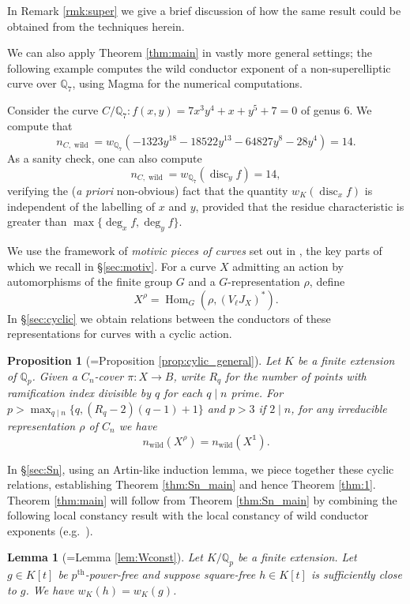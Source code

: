\documentclass[12pt]{amsart}
\newtheorem{lemma}[theorem]{Lemma}
\newtheorem{proposition}[theorem]{Proposition}
\theoremstyle{definition}
\newenvironment{example}
  {\pushQED{\qed}\renewcommand{\qedsymbol}{$\diamondsuit$}\examplex}
  {\popQED\endexamplex}
\theoremstyle{remark}
\newcommand{\QQ}{\mathbb{Q}}
\DeclareMathOperator{\Hom}{Hom}
\DeclareMathOperator{\disc}{disc}
\DeclareMathOperator{\wild}{wild}
\DeclareMathOperator{\one}{\mathds{1}}
\begin{document}
In Remark \ref{rmk:super} we give a brief discussion of how the same result could be obtained from the techniques herein. 

We can also apply Theorem \ref{thm:main} in vastly more general settings; the following example computes the wild conductor exponent of a non-superelliptic curve over $\QQ_7$, using Magma for the numerical computations.

\begin{example}
    Consider the curve $C/\QQ_7: f(x,y)=7x^3y^4+x+y^5+7=0$ of genus $6$. We compute that
    \[n_{C,\wild}=w_{\QQ_7}(-1323y^{18} - 18522y^{13} - 64827y^8 - 28y^4)=14.\]
    As a sanity check, one can also compute
    \[n_{C,\wild}=w_{\QQ_7}(\disc_y f)=14,\]
    verifying the (\textit{a priori} non-obvious) fact that the quantity $w_K(\disc_x f)$ is independent of the labelling of $x$ and $y$, provided that the residue characteristic is greater than $\max\{\deg_x f, \deg_y f\}$.
\end{example}

We use the framework of \textit{motivic pieces of curves} set out in \cite[\S2]{DGKM}, the key parts of which we recall in \S\ref{sec:motiv}. For a curve $X$ admitting an action by automorphisms of the finite group $G$ and a $G$-representation $\rho$, define
    \[ X^\rho=\Hom_G(\rho,(V_\ell J_X)^*).\]
In \S\ref{sec:cyclic} we obtain relations between the conductors of these representations for curves with a cyclic action.

\begin{proposition}[=Proposition \ref{prop:cylic_general}]
    Let $K$ be a finite extension of $\QQ_p$. Given a $C_n$-cover $\pi:X\to B$, write $R_q$ for the number of points with ramification index divisible by $q$ for each $q\mid n$ prime. For $p>\max_{q\mid n}\{q,(R_q-2)(q-1)+1\}$ and $p>3$ if $2\mid n$, for any irreducible representation $\rho$ of $C_n$ we have
    \[ n_{\wild}(X^{\rho})=n_{\wild}(X^{\one}).\]
\end{proposition}

In \S\ref{sec:Sn}, using an Artin-like induction lemma, we piece together these cyclic relations, establishing Theorem \ref{thm:Sn_main} and hence Theorem \ref{thm:1}. Theorem \ref{thm:main} will follow from Theorem \ref{thm:Sn_main} by combining the following local constancy result with the local constancy of wild conductor exponents (e.g.\ \cite[Theorem 5.1(1)]{Kisin1999}).

\begin{lemma}[{=Lemma \ref{lem:Wconst}}]
    Let $K/\QQ_p$ be a finite extension. Let $g\in K[t]$ be $p^\text{th}$-power-free and suppose square-free $h\in K[t]$ is sufficiently close to $g$. We have $w_K(h)=w_K(g)$.
\end{lemma}
\end{document}

